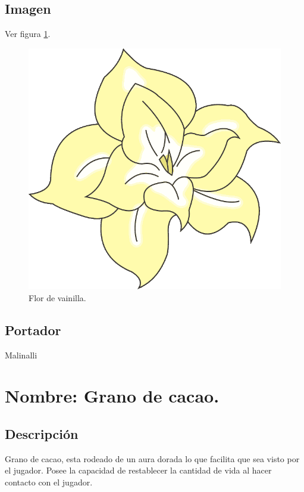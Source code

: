 	\subsection{Imagen}
		Ver figura \ref{fig:florVainilla}.
		\begin{figure}
			\centering
			\includegraphics[height=0.2 \textheight]{Imagenes/florVainilla}
			\caption{Flor de vainilla.}
			\label{fig:florVainilla}
		\end{figure}
	\subsection{Portador}
	Malinalli 

	\section{Nombre: Grano de cacao.}\label{item:cacao}
	\subsection{Descripción}
	Grano de cacao, esta rodeado de un aura dorada lo que facilita que sea visto por el jugador. Posee la capacidad de restablecer la cantidad de vida al hacer contacto con el jugador.
